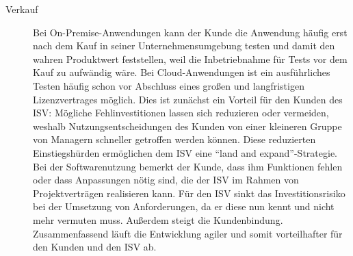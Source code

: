 \begin{description}

	\item[Verkauf] Bei On-Premise-Anwendungen kann der Kunde die Anwendung
häufig erst nach dem Kauf in seiner Unternehmensumgebung testen und damit den
wahren Produktwert feststellen, weil die Inbetriebnahme für Tests vor dem Kauf zu
aufwändig wäre. Bei Cloud-Anwendungen ist ein ausführliches Testen häufig schon 
vor Abschluss eines großen und langfristigen Lizenzvertrages möglich. Dies ist 
 zunächst ein Vorteil für den Kunden des ISV: Mögliche Fehlinvestitionen lassen 
sich reduzieren oder vermeiden, weshalb Nutzungsentscheidungen des Kunden von 
einer kleineren Gruppe von Managern schneller getroffen werden können. Diese 
reduzierten Einstiegshürden ermöglichen dem ISV eine "`land and 
expand"'-Strategie. Bei der Softwarenutzung bemerkt der Kunde, dass ihm 
Funktionen fehlen oder dass Anpassungen nötig sind, die der ISV im Rahmen von 
Projektverträgen realisieren kann. Für den ISV sinkt das Investitionsrisiko bei der 
Umsetzung von Anforderungen, da er diese nun kennt und nicht mehr vermuten muss. 
Außerdem steigt die Kundenbindung. Zusammenfassend läuft die Entwicklung agiler 
und somit vorteilhafter für den Kunden und den ISV ab.
\end{description}

